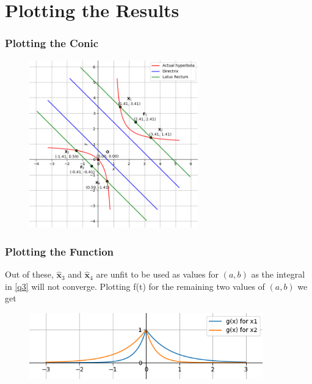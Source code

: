 \documentclass{beamer}
\theoremstyle{remark}
\let\vec\mathbf
\numberwithin{equation}{section}
\begin{document}
\section{Plotting the Results}
\begin{frame}[fragile]
	\frametitle{Plotting the Conic}

	\begin{figure}[H]
		\centering
		\includegraphics[width=0.65\textwidth]{Figures/Hyperbola.png}
	\end{figure}
	
\end{frame}

\begin{frame}[fragile]
	\frametitle{Plotting the Function}

    Out of these, $\vec{\hat{x}}_3$ and $\vec{\hat{x}}_4$ are unfit to be used as values for $(a, b)$ as the integral in \eqref{q3} will not converge. Plotting f(t) for the remaining two values of $(a,b)$ we get\\
    \bigskip

	\begin{figure}[H]
		\centering
		\includegraphics[width=0.9\textwidth]{Figures/function.png}
	\end{figure}
	
\end{frame}
\end{document}

